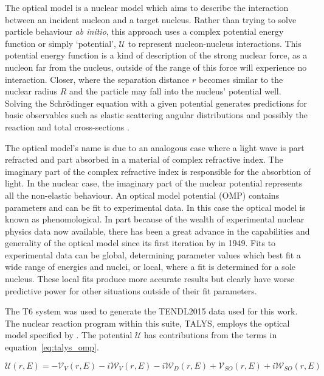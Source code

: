 The optical model is a nuclear model which aims to describe the interaction between an incident nucleon and a target nucleus. Rather than trying to solve particle behaviour \textit{ab initio}, this approach uses a complex potential energy function or simply `potential', $\mathcal{U}$ to represent nucleon-nucleus interactions. This potential energy function is a kind of description of the strong nuclear force, as a nucleon far from the nucleus, outside of the range of this force will experience no interaction. Closer, where the separation distance $r$ becomes similar to the nuclear radius $R$ and the particle may fall into the nucleus' potential well. Solving the Schr\"odinger equation with a given potential generates predictions for basic observables such as elastic scattering angular distributions and possibly the reaction and total cross-sections \cite{Hodgson1971}. 

The optical model's name is due to an analogous case where a light wave is part refracted and part absorbed in a material of complex refractive index. The imaginary part of the complex refractive index is responsible for the absorbtion of light. In the nuclear case, the imaginary part of the nuclear potential represents all the non-elastic behaviour. An optical model potential (OMP) contains parameters and can be fit to experimental data. In this case the optical model is known as phenomological. In part because of the wealth of experimental nuclear physics data now available, there has been a great advance in the capabilities and generality of the optical model since its first iteration by \citeauthor{Fernbach1949} in 1949. Fits to experimental data can be global, determining parameter values which best fit a wide range of energies and nuclei, or local, where a fit is determined for a sole nucleus. These local fits produce more accurate results but clearly have worse predictive power for other situations outside of their fit parameters.

The T6 system was used to generate the TENDL2015 data used for this work. The nuclear reaction program within this suite, TALYS, employs the optical model specified by \citeauthor{Koning2003}. The potential $\mathcal{U}$ has contributions from the terms in equation~\ref{eq:talys_omp}. 

\begin{equation}
  \mathcal{U}(r,E) = - \mathcal{V}_{V}(r,E) - i\mathcal{W}_{V}(r,E) - i\mathcal{W}_{D}(r,E) + \mathcal{V}_{SO}(r,E) + i\mathcal{W}_{SO}(r,E)
  \label{eq:talys_omp}
\end{equation}

